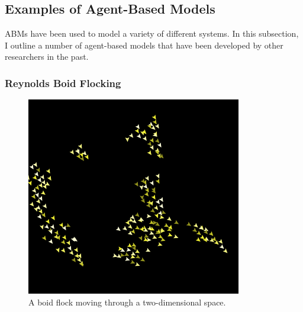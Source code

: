 


\subsection{Examples of Agent-Based Models}

ABMs have been used to model a variety of different systems.
In this subsection, I outline a number of agent-based models that have been developed by other researchers in the past.


\subsubsection{Reynolds Boid Flocking}

\begin{figure}[ht]
\centering
\includegraphics[scale=.66667]{images/netlogo_boidflock.png}
\caption{A boid flock moving through a two-dimensional space.}
\label{fig:netlogoboids}
\end{figure}

